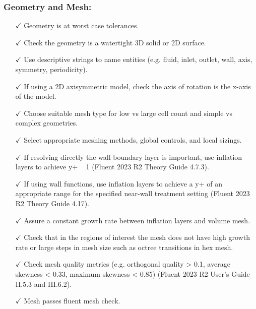 \subsubsection*{Geometry and Mesh:}
\begin{itemize}
    \item[$\checkmark$] Geometry is at worst case tolerances.
    \item[$\checkmark$] Check the geometry is a watertight 3D solid or 2D surface.
    \item[$\checkmark$] Use descriptive strings to name entities (e.g. fluid, inlet, outlet, wall, axis, symmetry, periodicity).
    \item[$\checkmark$] If using a 2D axisymmetric model, check the axis of rotation is the x-axis of the model.
    \item[$\checkmark$] Choose suitable mesh type for low vs large cell count and simple vs complex geometries.
    \item[$\checkmark$] Select appropriate meshing methods, global controls, and local sizings.
    \item[$\checkmark$] If resolving directly the wall boundary layer is important, use inflation layers to achieve y+ ~ 1 (Fluent 2023 R2 Theory Guide 4.7.3).
    \item[$\checkmark$] If using wall functions, use inflation layers to achieve a y+ of an appropriate range for the specified near-wall treatment setting (Fluent 2023 R2 Theory Guide 4.17).
    \item[$\checkmark$] Assure a constant growth rate between inflation layers and volume mesh.
    \item[$\checkmark$] Check that in the regions of interest the mesh does not have high growth rate or large steps in mesh size such as octree transitions in hex mesh.
    \item[$\checkmark$] Check mesh quality metrics (e.g. orthogonal quality > 0.1, average skewness < 0.33, maximum skewness < 0.85) (Fluent 2023 R2 User's Guide II.5.3 and III.6.2).
    \item[$\checkmark$] Mesh passes fluent mesh check.
\end{itemize}

